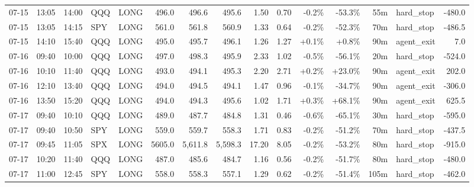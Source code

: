 \documentclass[11pt,a4paper,twoside]{article}
\begin{document}
\begin{landscape}
\begin{center}
\begin{longtable}{>{\color{txtmain}}l l l l l r r r r r r r r >{\color{txtmain}}l r}
07-15 & 13:05 & 14:00 & QQQ & LONG & 496.0 & 496.6 & 495.6 & 1.50 & 0.70 & \textcolor{lossred}{-0.2\%} & \textcolor{lossred}{-53.3\%} & 55m & hard\_stop & \textcolor{lossred}{-480.0} \\
07-15 & 13:05 & 14:15 & SPY & LONG & 561.0 & 561.8 & 560.9 & 1.33 & 0.64 & \textcolor{lossred}{-0.2\%} & \textcolor{lossred}{-52.3\%} & 70m & hard\_stop & \textcolor{lossred}{-486.5} \\
07-15 & 14:10 & 15:40 & QQQ & LONG & 495.0 & 495.7 & 496.1 & 1.26 & 1.27 & \textcolor{wingreen}{+0.1\%} & \textcolor{wingreen}{+0.8\%} & 90m & agent\_exit & \textcolor{wingreen}{7.0} \\
07-16 & 09:40 & 10:00 & QQQ & LONG & 497.0 & 498.3 & 495.9 & 2.33 & 1.02 & \textcolor{lossred}{-0.5\%} & \textcolor{lossred}{-56.1\%} & 20m & hard\_stop & \textcolor{lossred}{-524.0} \\
07-16 & 10:10 & 11:40 & QQQ & LONG & 493.0 & 494.1 & 495.3 & 2.20 & 2.71 & \textcolor{wingreen}{+0.2\%} & \textcolor{wingreen}{+23.0\%} & 90m & agent\_exit & \textcolor{wingreen}{202.0} \\
07-16 & 12:10 & 13:40 & QQQ & LONG & 494.0 & 494.5 & 494.1 & 1.47 & 0.96 & \textcolor{lossred}{-0.1\%} & \textcolor{lossred}{-34.7\%} & 90m & agent\_exit & \textcolor{lossred}{-306.0} \\
07-16 & 13:50 & 15:20 & QQQ & LONG & 494.0 & 494.3 & 495.6 & 1.02 & 1.71 & \textcolor{wingreen}{+0.3\%} & \textcolor{wingreen}{+68.1\%} & 90m & agent\_exit & \textcolor{wingreen}{625.5} \\
07-17 & 09:40 & 10:10 & QQQ & LONG & 489.0 & 487.7 & 484.8 & 1.31 & 0.46 & \textcolor{lossred}{-0.6\%} & \textcolor{lossred}{-65.1\%} & 30m & hard\_stop & \textcolor{lossred}{-595.0} \\
07-17 & 09:40 & 10:50 & SPY & LONG & 559.0 & 559.7 & 558.3 & 1.71 & 0.83 & \textcolor{lossred}{-0.2\%} & \textcolor{lossred}{-51.2\%} & 70m & hard\_stop & \textcolor{lossred}{-437.5} \\
07-17 & 09:45 & 11:05 & SPX & LONG & 5605.0 & 5,611.8 & 5,598.3 & 17.20 & 8.05 & \textcolor{lossred}{-0.2\%} & \textcolor{lossred}{-53.2\%} & 80m & hard\_stop & \textcolor{lossred}{-915.0} \\
07-17 & 10:20 & 11:40 & QQQ & LONG & 487.0 & 485.6 & 484.7 & 1.16 & 0.56 & \textcolor{lossred}{-0.2\%} & \textcolor{lossred}{-51.7\%} & 80m & hard\_stop & \textcolor{lossred}{-480.0} \\
07-17 & 11:00 & 12:45 & SPY & LONG & 558.0 & 558.3 & 557.1 & 1.29 & 0.62 & \textcolor{lossred}{-0.2\%} & \textcolor{lossred}{-51.4\%} & 105m & hard\_stop & \textcolor{lossred}{-462.0} \\

\end{longtable}
\end{center}
\end{landscape}
\end{document}
